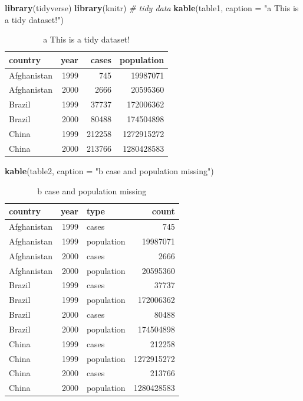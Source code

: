 \documentclass[]{book}
\newenvironment{Shaded}{\begin{snugshade}}{\end{snugshade}}
\newcommand{\KeywordTok}[1]{\textcolor[rgb]{0.13,0.29,0.53}{\textbf{#1}}}
\newcommand{\DataTypeTok}[1]{\textcolor[rgb]{0.13,0.29,0.53}{#1}}
\newcommand{\StringTok}[1]{\textcolor[rgb]{0.31,0.60,0.02}{#1}}
\newcommand{\CommentTok}[1]{\textcolor[rgb]{0.56,0.35,0.01}{\textit{#1}}}
\newcommand{\NormalTok}[1]{#1}
\begin{document}
\begin{Shaded}
\begin{Highlighting}[]
\KeywordTok{library}\NormalTok{(tidyverse)}
\KeywordTok{library}\NormalTok{(knitr)}
\CommentTok{# tidy data}
\KeywordTok{kable}\NormalTok{(table1, }\DataTypeTok{caption =} \StringTok{"a This is a tidy dataset!"}\NormalTok{)}
\end{Highlighting}
\end{Shaded}

\begin{table}[t]

\caption{\label{tab:unnamed-chunk-12}a This is a tidy dataset!}
\centering
\begin{tabular}{l|r|r|r}
\hline
country & year & cases & population\\
\hline
Afghanistan & 1999 & 745 & 19987071\\
\hline
Afghanistan & 2000 & 2666 & 20595360\\
\hline
Brazil & 1999 & 37737 & 172006362\\
\hline
Brazil & 2000 & 80488 & 174504898\\
\hline
China & 1999 & 212258 & 1272915272\\
\hline
China & 2000 & 213766 & 1280428583\\
\hline
\end{tabular}
\end{table}

\begin{Shaded}
\begin{Highlighting}[]
\KeywordTok{kable}\NormalTok{(table2, }\DataTypeTok{caption =} \StringTok{"b case and population missing"}\NormalTok{)}
\end{Highlighting}
\end{Shaded}

\begin{table}[t]

\caption{\label{tab:unnamed-chunk-12}b case and population missing}
\centering
\begin{tabular}{l|r|l|r}
\hline
country & year & type & count\\
\hline
Afghanistan & 1999 & cases & 745\\
\hline
Afghanistan & 1999 & population & 19987071\\
\hline
Afghanistan & 2000 & cases & 2666\\
\hline
Afghanistan & 2000 & population & 20595360\\
\hline
Brazil & 1999 & cases & 37737\\
\hline
Brazil & 1999 & population & 172006362\\
\hline
Brazil & 2000 & cases & 80488\\
\hline
Brazil & 2000 & population & 174504898\\
\hline
China & 1999 & cases & 212258\\
\hline
China & 1999 & population & 1272915272\\
\hline
China & 2000 & cases & 213766\\
\hline
China & 2000 & population & 1280428583\\
\hline
\end{tabular}
\end{table}
\end{document}
